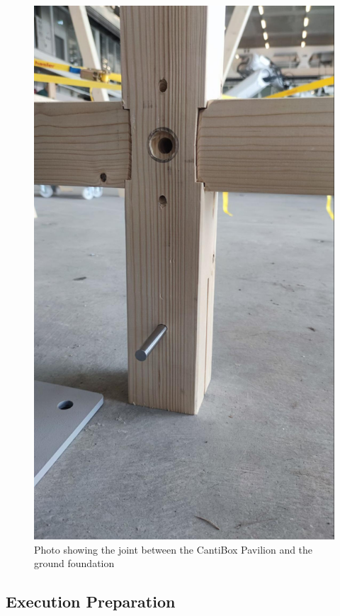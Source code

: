 \begin{figure}[!h]
\begin{minipage}[b]{0.3\textwidth}
        \includegraphics[width=\textwidth]{images/08/img26.jpg}
        \caption{Photo showing the joint between the CantiBox Pavilion and the ground foundation}
        \label{fig:photo-cantibox-foundation}
    \end{minipage}
\end{figure}

\subsection{Execution Preparation}
\label{subsection:exploration-5-execution-plan}

